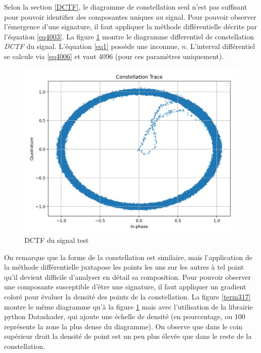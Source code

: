 \vspace{0.1cm}

Selon la section \ref{DCTF}, le diagramme de constellation seul n'est pas suffisant pour pouvoir identifier des composantes uniques au signal. Pour pouvoir observer l'émergence d'une signature, il faut appliquer la méthode différentielle décrite par l'équation \ref{eq4003}. La figure \ref{term316} montre le diagramme differentiel de constellation \textit{DCTF} du signal. L'équation \ref{eq1} possède une inconnue, $n$. L'interval différentiel se calcule via \ref{eq4006} et vaut 4096 (pour ces paramètres uniquement).


\newpage

\begin{figure}[h]
\centering

\includegraphics[scale=0.25]{images/dctf3.png}
\caption{DCTF du signal test}\label{term316}
\end{figure}

On remarque que la forme de la constellation est similaire, mais l'application de la méthode différentielle juxtapose les points les uns sur les autres à tel point qu'il devient difficile d'analyser en détail sa composition. Pour pouvoir observer une composante susceptible d'être une signature, il faut appliquer un gradient coloré pour évaluer la densité des points de la constellation. La figure \ref{term317} montre le même diagramme qu'à la figure \ref{term316} mais avec l'utilisation de la librairie python Datashader, qui ajoute une échelle de densité (en pourcentage, ou 100 représente la zone la plus dense du diagramme). On observe que dans le coin supérieur droit la densité de point est un peu plus élevée que dans le reste de la constellation.

